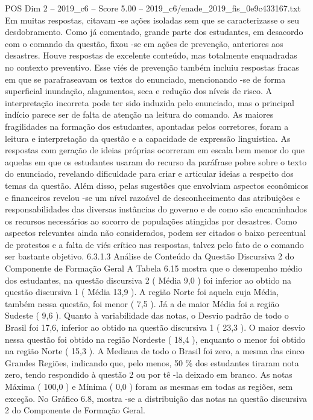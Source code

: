 \begin{textsample}{POS Dim 2 – 2019\_c6 – Score 5.00 – 2019\_c6/enade\_2019\_fis\_0e9c433167.txt}
Em muitas respostas, citavam -se ações isoladas sem que se caracterizasse o seu desdobramento.
Como já comentado, grande parte dos estudantes, em desacordo com o comando da questão, fixou -se em ações de prevenção, anteriores aos desastres.
Houve respostas de excelente conteúdo, mas totalmente enquadradas no contexto preventivo.
Esse viés de prevenção também incluiu respostas fracas em que se parafraseavam os textos do enunciado, mencionando -se de forma superficial inundação, alagamentos, seca e redução dos níveis de risco.
A interpretação incorreta pode ter sido induzida pelo enunciado, mas o principal indício parece ser de falta de atenção na leitura do comando.
As maiores fragilidades na formação dos estudantes, apontadas pelos corretores, foram a leitura e interpretação da questão e a capacidade de expressão linguística.
As respostas com geração de ideias próprias ocorreram em escala bem menor do que aquelas em que os estudantes usaram do recurso da paráfrase pobre sobre o texto do enunciado, revelando dificuldade para criar e articular ideias a respeito dos temas da questão.
Além disso, pelas sugestões que envolviam aspectos econômicos e financeiros revelou -se um nível razoável de desconhecimento das atribuições e responsabilidades das diversas instâncias do governo e de como são encaminhados os recursos necessários ao socorro de populações atingidas por desastres.
Como aspectos relevantes ainda não considerados, podem ser citados o baixo percentual de protestos e a falta de viés crítico nas respostas, talvez pelo fato de o comando ser bastante objetivo. 6.3.1.3 Análise de Conteúdo da Questão Discursiva 2 do Componente de Formação Geral A Tabela 6.15 mostra que o desempenho médio dos estudantes, na questão discursiva 2 ( Média 9,0 ) foi inferior ao obtido na questão discursiva 1 ( Média 13,9 ).
A região Norte foi aquela cuja Média, também nessa questão, foi menor ( 7,5 ).
Já a de maior Média foi a região Sudeste ( 9,6 ).
Quanto à variabilidade das notas, o Desvio padrão de todo o Brasil foi 17,6, inferior ao obtido na questão discursiva 1 ( 23,3 ).
O maior desvio nessa questão foi obtido na região Nordeste ( 18,4 ), enquanto o menor foi obtido na região Norte ( 15,3 ).
A Mediana de todo o Brasil foi zero, a mesma das cinco Grandes Regiões, indicando que, pelo menos, 50 \% dos estudantes tiraram nota zero, tendo respondido à questão 2 ou por tê -la deixado em branco.
As notas Máxima ( 100,0 ) e Mínima ( 0,0 ) foram as mesmas em todas as regiões, sem exceção.
No Gráfico 6.8, mostra -se a distribuição das notas na questão discursiva 2 do Componente de Formação Geral.

\end{textsample}
